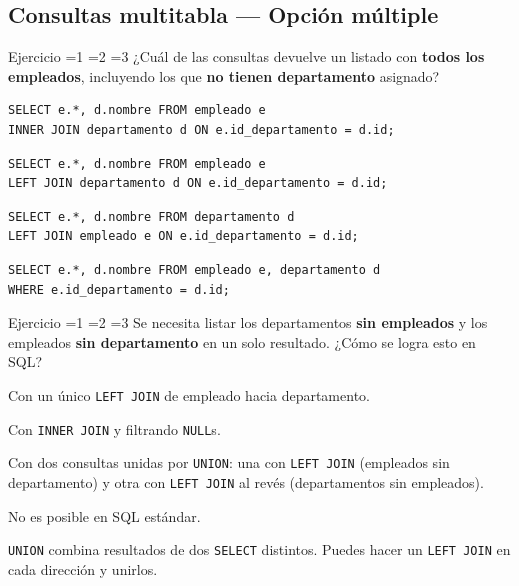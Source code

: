 \documentclass[12pt, a4paper]{article}
\newcommand{\estrella}{{\color{Goldenrod}\faStarSolid}}
\newcommand{\estrellavacia}{{\color{gray!45}\faStarSolid}}
\newcommand{\nivel}[1]{%
  \ifnum#1=1\estrella\estrellavacia\estrellavacia\fi
  \ifnum#1=2\estrella\estrella\estrellavacia\fi
  \ifnum#1=3\estrella\estrella\estrella\fi
}
\newcounter{numej}
\newcommand{\ej}{\stepcounter{numej}\thenumej}
\begin{document}
\subsection{Consultas multitabla — Opción múltiple}

\begin{ejercicio}{Ejercicio \ej}{\nivel{2}}
¿Cuál de las consultas devuelve un listado con \textbf{todos los empleados},
incluyendo los que \textbf{no tienen departamento} asignado?

\begin{opciones}
  \item
\begin{lstlisting}
SELECT e.*, d.nombre FROM empleado e
INNER JOIN departamento d ON e.id_departamento = d.id;
\end{lstlisting}
  \item
\begin{lstlisting}
SELECT e.*, d.nombre FROM empleado e
LEFT JOIN departamento d ON e.id_departamento = d.id;
\end{lstlisting}
  \item
\begin{lstlisting}
SELECT e.*, d.nombre FROM departamento d
LEFT JOIN empleado e ON e.id_departamento = d.id;
\end{lstlisting}
  \item
\begin{lstlisting}
SELECT e.*, d.nombre FROM empleado e, departamento d
WHERE e.id_departamento = d.id;
\end{lstlisting}
\end{opciones}
\end{ejercicio}

\begin{ejercicio}{Ejercicio \ej}{\nivel{3}}
Se necesita listar los departamentos \textbf{sin empleados} y los
empleados \textbf{sin departamento} en un solo resultado. ¿Cómo se
logra esto en SQL?

\begin{opciones}
  \item Con un único \texttt{LEFT JOIN} de empleado hacia departamento.
  \item Con \texttt{INNER JOIN} y filtrando \texttt{NULL}s.
  \item Con dos consultas unidas por \texttt{UNION}: una con
        \texttt{LEFT JOIN} (empleados sin departamento) y otra con
        \texttt{LEFT JOIN} al revés (departamentos sin empleados).
  \item No es posible en SQL estándar.
\end{opciones}

\begin{hint}
\texttt{UNION} combina resultados de dos \texttt{SELECT} distintos.
Puedes hacer un \texttt{LEFT JOIN} en cada dirección y unirlos.
\end{hint}
\end{ejercicio}
\end{document}
